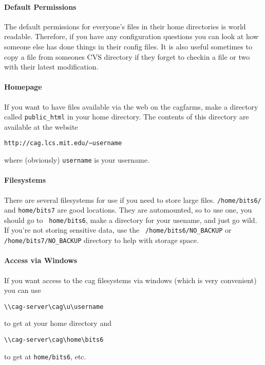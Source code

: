 \paragraph{Default Permissions}
The default permissions for everyone's files in their home directories
is world readable. Therefore, if you have any configuration questions 
you can look at how someone else has done things in their config files.
It is also useful sometimes to copy a file from someones
CVS directory if they forget to checkin a file or two with their
latest modification.

\paragraph{Homepage}
If you want to have files available via the web on the cagfarms, make
a directory called {\tt public\_html} in your home directory. The contents
of this directory are available at the website
\begin{verbatim}
http://cag.lcs.mit.edu/~username
\end{verbatim}
 where (obviously) {\tt username} is your username.

\paragraph{Filesystems}
There are several filesystems for use if you need to store large
files.  {\tt /home/bits6/} and {\tt home/bits7} are good locations.
They are automounted, so to use one, you should go to {\tt
  home/bits6}, make a directory for your usename, and just go wild.
If you're not storing sensitive data, use the {\tt
  /home/bits6\slash{}NO\_BACKUP} or {\tt /home/bits7/NO\_BACKUP}
directory to help with storage space.

\paragraph{Access via Windows}
If you want access to the cag filesystems via windows
(which is very convenient) you can use
\begin{verbatim}
\\cag-server\cag\u\username
\end{verbatim}
to get at your home directory and 
\begin{verbatim}
\\cag-server\cag\home\bits6
\end{verbatim}
 to get at {\tt home/bits6}, etc.

